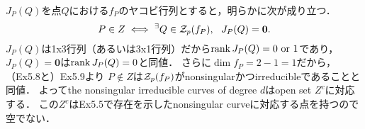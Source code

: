 \documentclass[a4paper]{jsarticle}
\begin{document}
    $J_P(Q)$を点$Q$における$f_P$のヤコビ行列とすると，明らかに次が成り立つ．
    \[ P \in Z \iff {}^{\exists} Q \in \mathcal{Z}_p(f_P),~~ J_P(Q)=\mathbf{0}. \]
    $J_P(Q)$は1x3行列（あるいは3x1行列）だから$\operatorname{rank} J_P(Q)=0 \text{ or } 1$であり，
    $J_P(Q)=\mathbf{0}$は$\operatorname{rank} J_P(Q)=0$と同値．
    さらに$\dim f_P=2-1=1$だから，（Ex5.8と）Ex5.9より
    $P \not \in Z$は$\mathcal{Z}_p(f_P)$がnonsingularかつirreducibleであることと同値．
    よってthe nonsingular irreducible curves of degree $d$はopen set $Z^c$に対応する．
    この$Z^c$はEx5.5で存在を示したnonsingular curveに対応する点を持つので空でない．
\end{document}
